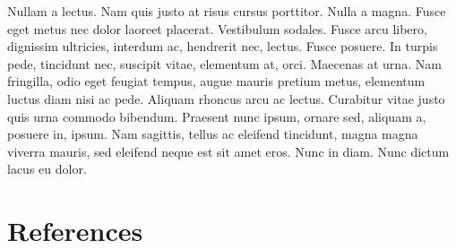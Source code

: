 \documentclass[12pt]{report}
\begin{document}
Nullam a lectus. Nam quis justo at risus cursus porttitor. Nulla a magna. Fusce eget metus nec dolor laoreet placerat. Vestibulum sodales. Fusce arcu libero, dignissim ultricies, interdum ac, hendrerit nec, lectus. Fusce posuere. In turpis pede, tincidunt nec, suscipit vitae, elementum at, orci. Maecenas at urna. Nam fringilla, odio eget feugiat tempus, augue mauris pretium metus, elementum luctus diam nisi ac pede. Aliquam rhoncus arcu ac lectus. Curabitur vitae justo quis urna commodo bibendum. Praesent nunc ipsum, ornare sed, aliquam a, posuere in, ipsum. Nam sagittis, tellus ac eleifend tincidunt, magna magna viverra mauris, sed eleifend neque est sit amet eros. Nunc in diam. Nunc dictum lacus eu dolor.


\chapter{References}

%

\thesisvita
\end{document}
